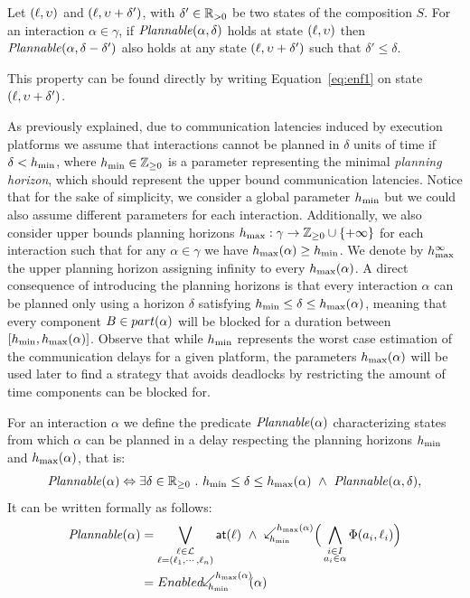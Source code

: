 \begin{property}\label{pt:plnIn2}
Let $(\ell,\upsilon)$ and $(\ell,\upsilon+\delta')$, with $\delta'\in\mathbb{R}_{> 0}$ be two states of 
the composition $S$. For an interaction $\alpha\in\gamma$, if $\mathit{Plannable(\alpha,\delta)}$ 
holds at state $(\ell,\upsilon)$ then $\mathit{Plannable(\alpha,\delta-\delta')}$ 
also holds at any state $(\ell,\upsilon+\delta')$ such that $\delta'\le\delta$.
\end{property}
This property can be found directly by writing Equation~\ref{eq:enf1} on state 
$(\ell,\upsilon+\delta')$.

As previously explained, due to communication latencies induced by execution platforms 
we assume that interactions cannot be planned in $\delta$ units of time if $\delta < h_{\min}$, 
where $h_{\min} \in \mathbb{Z}_{\ge 0}$ is a parameter representing the minimal \emph{planning horizon}, 
which should represent the upper bound communication latencies.
Notice that for the sake of simplicity, we consider a global parameter $h_{\min}$ but 
we could also assume different parameters for each interaction.
Additionally, we also consider upper bounds planning horizons 
$h_{\max} : \gamma \to \mathbb{Z}_{\ge 0}\cup\{ +\infty \}$ 
for each interaction such that for any $\alpha\in\gamma$ we have $h_{\max}(\alpha) \geq h_{\min}$.
We denote by $h_{\max}^{\infty}$ the upper planning horizon assigning infinity to every $h_{\max}(\alpha)$.
A direct consequence of introducing the planning horizons is that every interaction $\alpha$ 
can be planned only using a horizon $\delta$ satisfying $h_{\min} \leq \delta \leq h_{\max}(\alpha)$,
meaning that every component $B\in part(\alpha)$ will be blocked for a duration between
$[h_{\min},h_{\max}(\alpha)]$. Observe that while $h_{\min}$ represents the worst case estimation of the 
communication delays for a given platform, the parameters $h_{\max}(\alpha)$ will be used later 
to find a strategy that avoids deadlocks by restricting the amount of time components 
can be blocked for.

For an interaction $\alpha$ we define the predicate $\mathit{Plannable(\alpha)}$ 
characterizing states from which $\alpha$ can be planned in a delay respecting 
the planning horizons $h_{\min}$ and $h_{\max}(\alpha)$, that is:
\begin{displaymath}
\plntxt{\alpha}\Leftrightarrow\exists\delta\in\realpoz\ .\ \hmin\leq\delta\leq\hmax(\alpha)\ 
  \wedge\ \plnIntxt{\alpha}{\delta},
\end{displaymath}
It can be written formally as follows:
\begin{align*}\label{eq:pln}
 \plntxt{\alpha}&=\bigvee_{\substack{\loc\in\Loc\\\loc=(\loc_1,\cdots,\loc_n)}}\al{\loc}\ \wedge\
  \backwardp{\hmin}{\hmx} \Big(\bigwedge_{\substack{i\in I\\a_i\in\alpha}}\Phi(a_i,\loc_i)\Big)\\
                &=\enabledbackwardb{\alpha}{\hmin}{\hmx}
\end{align*}

